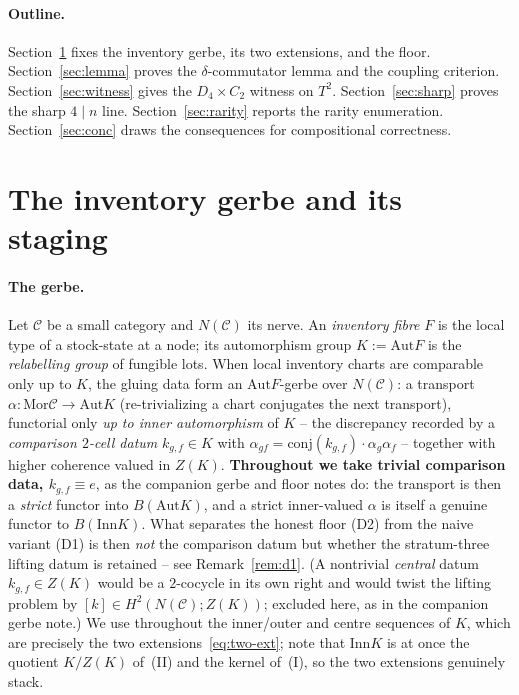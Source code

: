 \documentclass[11pt]{article}
\theoremstyle{definition}
\newcommand{\C}{\mathcal{C}}
\newcommand{\Mor}{\mathrm{Mor}}
\newcommand{\Aut}{\mathrm{Aut}}
\newcommand{\Inn}{\mathrm{Inn}}
\begin{document}
\paragraph{Outline.} Section~\ref{sec:staging} fixes the inventory gerbe, its two extensions,
and the floor. Section~\ref{sec:lemma} proves the $\delta$-commutator lemma and the coupling
criterion. Section~\ref{sec:witness} gives the $D_4\times C_2$ witness on $T^2$.
Section~\ref{sec:sharp} proves the sharp $4\mid n$ line. Section~\ref{sec:rarity} reports the
rarity enumeration. Section~\ref{sec:conc} draws the consequences for compositional correctness.

\section{The inventory gerbe and its staging}\label{sec:staging}

\paragraph{The gerbe.} Let $\C$ be a small category and $N(\C)$ its nerve. An
\emph{inventory fibre} $F$ is the local type of a stock-state at a node; its automorphism
group $K:=\Aut F$ is the \emph{relabelling group} of fungible lots. When local inventory
charts are comparable only up to $K$, the gluing data form an $\Aut F$-gerbe over $N(\C)$:
a transport $\alpha\colon\Mor\C\to\Aut K$ (re-trivializing a chart conjugates the next
transport), functorial only \emph{up to inner automorphism} of $K$ -- the discrepancy
recorded by a \emph{comparison $2$-cell datum} $k_{g,f}\in K$ with
$\alpha_{gf}=\mathrm{conj}(k_{g,f})\cdot\alpha_g\alpha_f$ -- together with
higher coherence valued in $Z(K)$. \textbf{Throughout we take trivial comparison data,
$k_{g,f}\equiv e$}, as the companion gerbe and floor notes do: the transport is then a
\emph{strict} functor into $B(\Aut K)$, and a strict inner-valued $\alpha$ is itself a
genuine functor to $B(\Inn K)$. What separates the honest floor \textup{(D2)} from the
naive variant \textup{(D1)} is then \emph{not} the comparison datum but whether the
stratum-three lifting datum is retained -- see Remark~\ref{rem:d1}. (A nontrivial
\emph{central} datum $k_{g,f}\in Z(K)$ would be a $2$-cocycle in its own right and would
twist the lifting problem by $[k]\in H^2(N(\C);Z(K))$; excluded here, as in the companion gerbe
note.) We use throughout the inner/outer and centre sequences of $K$,
which are precisely the two extensions~\eqref{eq:two-ext}; note that $\Inn K$ is at once the
quotient $K/Z(K)$ of~(II) and the kernel of~(I), so the two extensions genuinely stack.
\end{document}
